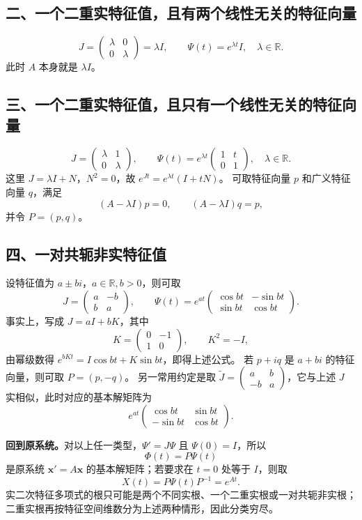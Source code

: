 \documentclass[11pt,a4paper]{ctexart}
\newcommand{\xx}{\boldsymbol{x}}
\begin{document}
\subsection*{二、一个二重实特征值，且有两个线性无关的特征向量}
\[
\boxed{J=\begin{pmatrix}\lambda&0\\0&\lambda\end{pmatrix}=\lambda I,
\qquad \Psi(t)=e^{\lambda t}I,\quad \lambda\in\mathbb R.}
\]
此时 $A$ 本身就是 $\lambda I$。

\subsection*{三、一个二重实特征值，且只有一个线性无关的特征向量}
\[
\boxed{J=\begin{pmatrix}\lambda&1\\0&\lambda\end{pmatrix},\qquad
\Psi(t)=e^{\lambda t}\begin{pmatrix}1&t\\0&1\end{pmatrix},\quad\lambda\in\mathbb R.}
\]
这里 $J=\lambda I+N$，$N^2=0$，故 $e^{Jt}=e^{\lambda t}(I+tN)$。
可取特征向量 $p$ 和广义特征向量 $q$，满足
\[
(A-\lambda I)p=0,\qquad (A-\lambda I)q=p,
\]
并令 $P=(p,q)$。

\subsection*{四、一对共轭非实特征值}
设特征值为 $a\pm bi$，$a\in\mathbb R,b>0$，则可取
\[
\boxed{J=\begin{pmatrix}a&-b\\b&a\end{pmatrix},\qquad
\Psi(t)=e^{at}\begin{pmatrix}\cos bt&-\sin bt\\\sin bt&\cos bt\end{pmatrix}.}
\]
事实上，写成 $J=aI+bK$，其中
\[
K=\begin{pmatrix}0&-1\\1&0\end{pmatrix},\qquad K^2=-I,
\]
由幂级数得 $e^{bKt}=I\cos bt+K\sin bt$，即得上述公式。
若 $p+iq$ 是 $a+bi$ 的特征向量，则可取 $P=(p,-q)$。
另一常用约定是取 $\widetilde J=\begin{pmatrix}a&b\\-b&a\end{pmatrix}$，它与上述 $J$ 实相似，此时对应的基本解矩阵为
\[
e^{at}\begin{pmatrix}\cos bt&\sin bt\\-\sin bt&\cos bt\end{pmatrix}.
\]

\textbf{回到原系统。}对以上任一类型，$\Psi'=J\Psi$ 且 $\Psi(0)=I$，所以
\[
\boxed{\Phi(t)=P\Psi(t)}
\]
是原系统 $\xx'=A\xx$ 的基本解矩阵；若要求在 $t=0$ 处等于 $I$，则取
\[
\boxed{X(t)=P\Psi(t)P^{-1}=e^{At}.}
\]
实二次特征多项式的根只可能是两个不同实根、一个二重实根或一对共轭非实根；二重实根再按特征空间维数分为上述两种情形，因此分类穷尽。
\end{document}

